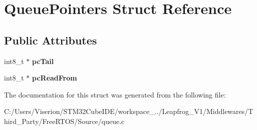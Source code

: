 \hypertarget{struct_queue_pointers}{}\section{Queue\+Pointers Struct Reference}
\label{struct_queue_pointers}
\subsection*{Public Attributes}
\begin{DoxyCompactItemize}
\item 
\mbox{\label{struct_queue_pointers_acbbdc8eb47b348a824c7bced41512a38}} 
int8\+\_\+t $\ast$ {\bfseries pc\+Tail}
\item 
\mbox{\label{struct_queue_pointers_af381d02bbe6bc4a77934c6fd97598913}} 
int8\+\_\+t $\ast$ {\bfseries pc\+Read\+From}
\end{DoxyCompactItemize}


The documentation for this struct was generated from the following file\+:\begin{DoxyCompactItemize}
\item 
C\+:/\+Users/\+Viserion/\+S\+T\+M32\+Cube\+I\+D\+E/workspace\+\_../\+Leapfrog\+\_\+\+V1/\+Middlewares/\+Third\+\_\+\+Party/\+Free\+R\+T\+O\+S/\+Source/queue.\+c\end{DoxyCompactItemize}
